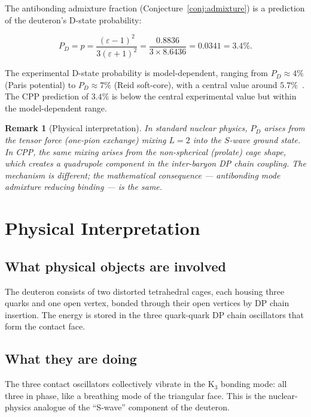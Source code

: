 \documentclass[11pt,letterpaper]{article}
\newtheorem{remark}[theorem]{Remark}
\newcommand{\Kthree}{\mathrm{K}_3}
\newcommand{\epscage}{\varepsilon}
\begin{document}
The antibonding admixture fraction
(Conjecture~\ref{conj:admixture}) is a prediction of the
deuteron's D-state probability:

\begin{equation}
P_D = p = \frac{(\epscage-1)^2}{3(\epscage+1)^2}
= \frac{0.8836}{3 \times 8.6436} = 0.0341 = 3.4\%.
\label{eq:PD}
\end{equation}

The experimental D-state probability is model-dependent,
ranging from $P_D \approx 4\%$ (Paris potential) to
$P_D \approx 7\%$ (Reid soft-core), with a central value
around $5.7\%$~\citep{pdg2024}.  The CPP prediction of $3.4\%$
is below the central experimental value but within the
model-dependent range.

\begin{remark}[Physical interpretation]
In standard nuclear physics, $P_D$ arises from the tensor
force (one-pion exchange) mixing $L = 2$ into the $S$-wave
ground state.  In CPP, the same mixing arises from the
non-spherical (prolate) cage shape, which creates a
quadrupole component in the inter-baryon DP chain coupling.
The mechanism is different; the mathematical consequence
--- antibonding mode admixture reducing binding --- is the
same.
\end{remark}

\section{Physical Interpretation}
\label{sec:phys}

\subsection{What physical objects are involved}

The deuteron consists of two distorted tetrahedral cages,
each housing three quarks and one open vertex, bonded through
their open vertices by DP chain insertion.  The energy is
stored in the three quark-quark DP chain oscillators that
form the contact face.

\subsection{What they are doing}

The three contact oscillators collectively vibrate in the
$\Kthree$ bonding mode: all three in phase, like a
breathing mode of the triangular face.  This is the
nuclear-physics analogue of the ``S-wave'' component of
the deuteron.
\end{document}
